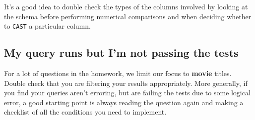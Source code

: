 \documentclass[
  letterpaper,
  DIV=11,
  numbers=noendperiod]{scrreprt}
\begin{document}
It's a good idea to double check the types of the columns involved by
looking at the schema before performing numerical comparisons and when
deciding whether to \texttt{CAST} a particular column.

\subsection{My query runs but I'm not passing the
tests}\label{my-query-runs-but-im-not-passing-the-tests}

For a lot of questions in the homework, we limit our focus to
\textbf{movie} titles. Double check that you are filtering your results
appropriately. More generally, if you find your queries aren't erroring,
but are failing the tests due to some logical error, a good starting
point is always reading the question again and making a checklist of all
the conditions you need to implement.
\end{document}
